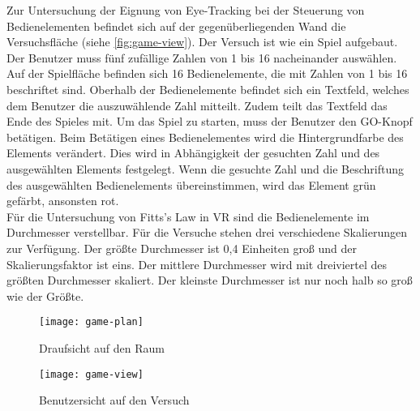 Zur Untersuchung der Eignung von Eye-Tracking bei der Steuerung von Bedienelementen befindet sich auf der gegenüberliegenden Wand die Versuchsfläche (siehe \autoref{fig:game-view}). Der Versuch ist wie ein Spiel aufgebaut. Der Benutzer muss fünf zufällige  Zahlen von 1 bis 16 nacheinander auswählen. Auf der Spielfläche befinden sich 16 Bedienelemente, die mit Zahlen von 1 bis 16 beschriftet sind. Oberhalb der Bedienelemente befindet sich ein Textfeld, welches dem Benutzer die auszuwählende Zahl mitteilt. Zudem teilt das Textfeld das Ende des Spieles mit. Um das Spiel zu starten, muss der Benutzer den GO-Knopf betätigen. Beim Betätigen eines Bedienelementes wird die Hintergrundfarbe des Elements verändert. Dies wird in Abhängigkeit der gesuchten Zahl und des ausgewählten Elements festgelegt. Wenn die gesuchte Zahl und die Beschriftung des ausgewählten Bedienelements übereinstimmen, wird das Element grün gefärbt, ansonsten rot. \\
Für die Untersuchung von Fitts's Law in \ac{VR} sind die Bedienelemente im Durchmesser verstellbar. Für die Versuche stehen drei verschiedene Skalierungen zur Verfügung. Der größte Durchmesser ist 0,4 Einheiten groß und der Skalierungsfaktor ist eins. Der mittlere Durchmesser wird mit dreiviertel des größten Durchmesser skaliert. Der kleinste Durchmesser ist nur noch halb so groß wie der Größte.

\begin{figure}[!htbp]
	\centering
	\texttt{[image: game-plan]}
	\caption[Draufsicht auf den Raum]{Draufsicht auf den Raum}
	\label{fig:game-plan}
\end{figure}

\begin{figure}[!htbp]
\centering
\texttt{[image: game-view]}
\caption[Benutzersicht auf den Versuch]{Benutzersicht auf den Versuch}
\label{fig:game-view}
\end{figure}

